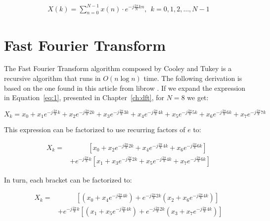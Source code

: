 \begin{align}
    X\left(k\right) = \sum\limits_{n=0}^{N-1}x\left(n\right)\cdot e^{-j\frac{2\pi}{N}kn},\ \ k = 0,1,2,\dots,N-1\label{eq:1}
\end{align}

\section{Fast Fourier Transform}
The Fast Fourier Transform algorithm composed by Cooley and Tukey is a recursive algorithm that runs in $O(n\log n)$ time. The following derivation is based on the one found in this article from librow \cite{fft:derivation}. If we expand the expression in Equation~\ref{eq:1}, presented in Chapter~\ref{ch:dft}, for $N = 8$ we get:

\begin{equation}
    X_{k} = x_0 + x_1e^{-j\frac{2\pi}{8}k} + x_2e^{-j\frac{2\pi}{8}2k} + x_3e^{-j\frac{2\pi}{8}3k} + x_4e^{-j\frac{2\pi}{8}4k} + x_5e^{-j\frac{2\pi}{8}5k} + x_6e^{-j\frac{2\pi}{8}6k} + x_7e^{-j\frac{2\pi}{8}7k}
\end{equation}\label{eq:first}

This expression can be factorized to use recurring factors of $e$ to:

\begin{equation}
\begin{align}
    X_{k} =&\ \ \ \ \ \ \ \ \ \ \ \ \left[x_0 + x_2e^{-j\frac{2\pi}{8}2k} + x_4e^{-j\frac{2\pi}{8}4k} + x_6e^{-j\frac{2\pi}{8}6k}\right]\\
           &+ e^{-j\frac{2\pi}{8}k}\left[x_1 + x_3e^{-j\frac{2\pi}{8}2k} + x_5e^{-j\frac{2\pi}{8}4k} + x_7e^{-j\frac{2\pi}{8}6k}\right]
\end{align}\label{eq:second}
\end{equation}

In turn, each bracket can be factorized to:

\begin{equation}
\begin{align}
    X_{k} =&\ \ \ \ \ \ \ \ \ \ \ \ \left[\left(x_0 + x_4e^{-j\frac{2\pi}{8}4k}\right) + e^{-j\frac{2\pi}{8}2k}\left(x_2 + x_6e^{-j\frac{2\pi}{8}4k}\right)\right]\\
           &+ e^{-j\frac{2\pi}{8}k}\left[\left(x_1 + x_5e^{-j\frac{2\pi}{8}4k}\right) + e^{-j\frac{2\pi}{8}2k}\left(x_3 + x_7e^{-j\frac{2\pi}{8}4k}\right)\right]
\end{align}\label{eq:third}
\end{equation}

